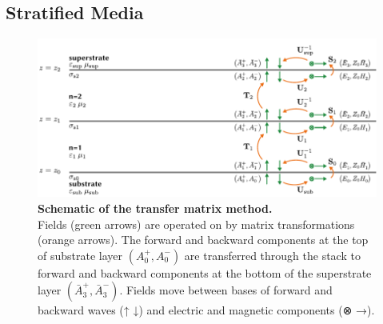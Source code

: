 \subsection{Stratified Media} \label{sec:stratmed}

\begin{figure}
 \includegraphics{figs/mt/TMM.pdf}
 \caption[Schematic of the transfer matrix method]{\label{fig:TMM}
 \textbf{Schematic of the transfer matrix method.}\small\\
 Fields (green arrows) are operated on by matrix transformations (orange
 arrows).
 The forward and backward components at the top of substrate layer
 $(A_0^+,A_0^-)$ are transferred through the stack to forward and backward
 components at the bottom of the superstrate layer $(\bar{A}_3^+,\bar{A}_3^-)$.
 Fields move between bases of forward and backward waves (↑ ↓) and
 electric and magnetic components (⊗ →).
 }
\end{figure}


